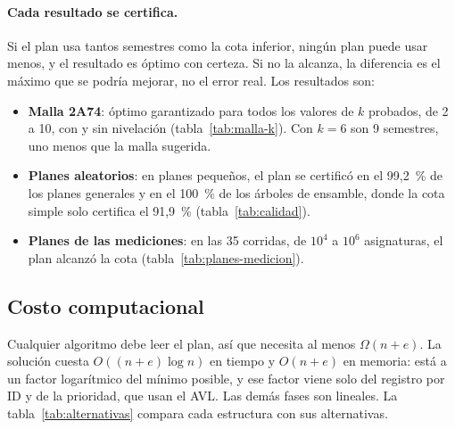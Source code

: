 \documentclass[11pt,letterpaper]{article}
\newcommand{\num}[1]{\pgfmathprintnumber[int detect]{#1}}
\begin{document}
\paragraph{Cada resultado se certifica.} Si el plan usa tantos semestres como la cota inferior, ningún plan puede usar menos, y el resultado es óptimo con certeza. Si no la alcanza, la diferencia es el máximo que se podría mejorar, no el error real. Los resultados son:
\begin{itemize}
\item \textbf{Malla 2A74}: óptimo garantizado para todos los valores de $k$ probados, de 2 a 10, con y sin nivelación (tabla~\ref{tab:malla-k}). Con $k = 6$ son 9 semestres, uno menos que la malla sugerida.
\item \textbf{Planes aleatorios}: en \num{12000} planes pequeños, el plan se certificó en el 99,2~\% de los planes generales y en el 100~\% de los árboles de ensamble, donde la cota simple solo certifica el 91,9~\% (tabla~\ref{tab:calidad}).
\item \textbf{Planes de las mediciones}: en las 35 corridas, de $10^4$ a $10^6$ asignaturas, el plan alcanzó la cota (tabla~\ref{tab:planes-medicion}).
\end{itemize}

\subsection{Costo computacional}
Cualquier algoritmo debe leer el plan, así que necesita al menos $\Omega(n + e)$. La solución cuesta $O((n + e) \log n)$ en tiempo y $O(n + e)$ en memoria: está a un factor logarítmico del mínimo posible, y ese factor viene solo del registro por ID y de la prioridad, que usan el AVL. Las demás fases son lineales. La tabla~\ref{tab:alternativas} compara cada estructura con sus alternativas.
\end{document}
